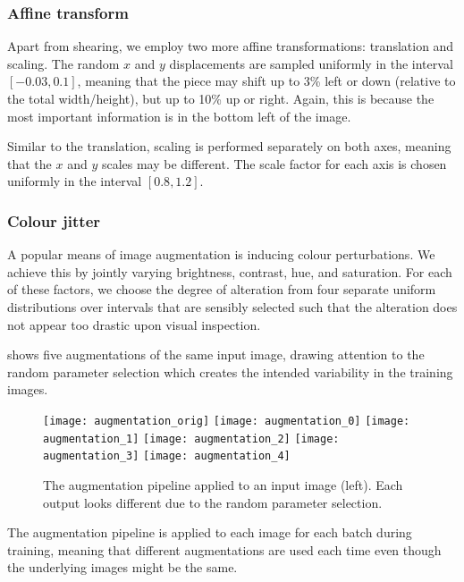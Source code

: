 \documentclass[../report.tex]{subfiles}
\begin{document}
\subsubsection{Affine transform}
Apart from shearing, we employ two more affine transformations: translation and scaling.
The random $x$ and $y$ displacements are sampled uniformly in the interval $[-0.03, 0.1]$, meaning that the piece may shift up to 3\% left or down (relative to the total width/height), but up to 10\% up or right.
Again, this is because the most important information is in the bottom left of the image.

Similar to the translation, scaling is performed separately on both axes, meaning that the $x$ and $y$ scales may be different.
The scale factor for each axis is chosen uniformly in the interval $[0.8, 1.2]$.

\subsubsection{Colour jitter}
A popular means of image augmentation is inducing colour perturbations.
We achieve this by jointly varying brightness, contrast, hue, and saturation.
For each of these factors, we choose the degree of alteration from four separate uniform distributions over intervals that are sensibly selected such that the alteration does not appear too drastic upon visual inspection.

 shows five augmentations of the same input image, drawing attention to the random parameter selection which creates the intended variability in the training images.
\begin{figure}
    \centering
    \texttt{[image: augmentation\_orig]}
    \texttt{[image: augmentation\_0]}
    \texttt{[image: augmentation\_1]}
    \texttt{[image: augmentation\_2]}
    \texttt{[image: augmentation\_3]}
    \texttt{[image: augmentation\_4]}
    \caption[The augmentation pipeline applied to an input image.]{The augmentation pipeline applied to an input image (left). Each output looks different due to the random parameter selection.}
    \label{fig:augmentations}
\end{figure}
The augmentation pipeline is applied to each image for each batch during training, meaning that different augmentations are used each time even though the underlying images might be the same.
\end{document}
